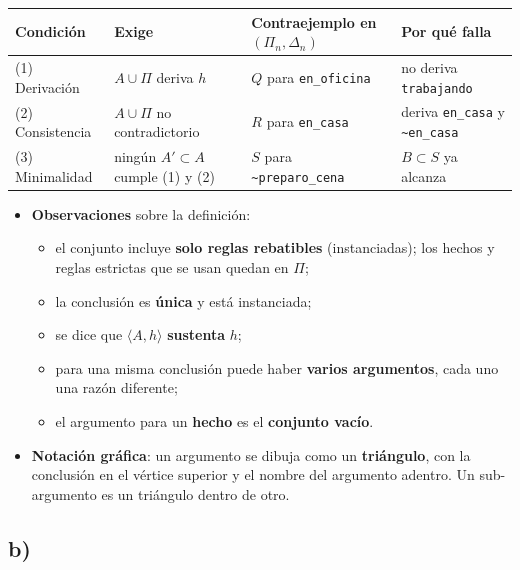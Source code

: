 \documentclass[11pt,a4paper]{article}
\newcommand{\nf}{\textasciitilde}                 %
\begin{document}
\begin{center}
\small
\begin{tabularx}{\linewidth}{@{}l l >{\raggedright\arraybackslash}X >{\raggedright\arraybackslash}X@{}}
\toprule
\textbf{Condición} & \textbf{Exige} & \textbf{Contraejemplo en $(\Pi_n, \Delta_n)$} & \textbf{Por qué falla} \\
\midrule
(1) Derivación & $A \cup \Pi$ deriva $h$ & $Q$ para \texttt{en\_oficina} & no deriva \texttt{trabajando} \\
(2) Consistencia & $A \cup \Pi$ no contradictorio & $R$ para \texttt{en\_casa} & deriva \texttt{en\_casa} y \texttt{\nf en\_casa} \\
(3) Minimalidad & ningún $A' \subset A$ cumple (1) y (2) & $S$ para \texttt{\nf preparo\_cena} & $B \subset S$ ya alcanza \\
\bottomrule
\end{tabularx}
\end{center}

\begin{extras}
\begin{itemize}
  \item \textbf{Observaciones} sobre la definición:
  \begin{itemize}
    \item el conjunto incluye \textbf{solo reglas rebatibles} (instanciadas); los hechos y reglas estrictas que se usan quedan en $\Pi$;
    \item la conclusión es \textbf{única} y está instanciada;
    \item se dice que $\langle A, h\rangle$ \textbf{sustenta} $h$;
    \item para una misma conclusión puede haber \textbf{varios argumentos}, cada uno una razón diferente;
    \item el argumento para un \textbf{hecho} es el \textbf{conjunto vacío}.
  \end{itemize}
  \item \textbf{Notación gráfica}: un argumento se dibuja como un \textbf{triángulo}, con la conclusión en el vértice superior y el nombre del argumento adentro. Un sub-argumento es un triángulo dentro de otro.
\end{itemize}
\end{extras}

\subsection{b)}
\end{document}
